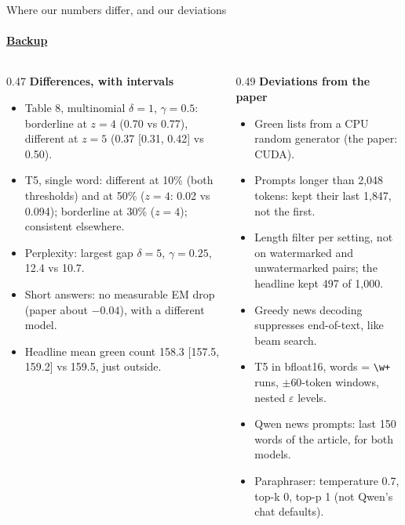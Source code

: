 \documentclass[aspectratio=169,10pt,t]{beamer}
\newcommand{\key}[1]{\textcolor{calblue}{\textbf{#1}}}
\begin{document}
\begin{frame}[label=b12]{Where our numbers differ, and our deviations}
  \framesubtitle{\hyperlink{b0}{Backup}}
  \footnotesize
  \begin{columns}[T,onlytextwidth]
    \begin{column}{0.47\textwidth}
      \key{Differences, with intervals}
      \begin{itemize}
        \item Table 8, multinomial $\delta = 1$, $\gamma = 0.5$: borderline at $z = 4$ (0.70 vs 0.77), different at $z = 5$ (0.37 [0.31, 0.42] vs 0.50).
        \item T5, single word: different at 10\% (both thresholds) and at 50\% ($z = 4$: 0.02 vs 0.094); borderline at 30\% ($z = 4$); consistent elsewhere.
        \item Perplexity: largest gap $\delta = 5$, $\gamma = 0.25$, 12.4 vs 10.7.
        \item Short answers: no measurable EM drop (paper about $-0.04$), with a different model.
        \item Headline mean green count 158.3 [157.5, 159.2] vs 159.5, just outside.
      \end{itemize}
    \end{column}
    \begin{column}{0.49\textwidth}
      \key{Deviations from the paper}
      \begin{itemize}
        \item Green lists from a CPU random generator (the paper: CUDA).
        \item Prompts longer than 2{,}048 tokens: kept their last 1{,}847, not the first.
        \item Length filter per setting, not on watermarked and unwatermarked pairs; the headline kept 497 of 1{,}000.
        \item Greedy news decoding suppresses end-of-text, like beam search.
        \item T5 in bfloat16, words = \texttt{\textbackslash w+} runs, $\pm 60$-token windows, nested $\varepsilon$ levels.
        \item Qwen news prompts: last 150 words of the article, for both models.
        \item Paraphraser: temperature 0.7, top-k 0, top-p 1 (not Qwen's chat defaults).
      \end{itemize}
    \end{column}
  \end{columns}
\end{frame}
\end{document}
